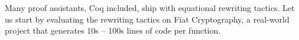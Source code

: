 \documentclass[sn-mathphys,pdflatex]{sn-jnl}%
\makeatletter
\renewcommand{\todo}[2][]{\tikzexternaldisable\@todo[#1]{#2}\tikzexternalenable}
\theoremstyle{thmstyleone}%
\theoremstyle{thmstyletwo}%
\theoremstyle{thmstylethree}%
\makeatother
\begin{document}
Many proof assistants, Coq included, ship with equational rewriting tactics.
Let us start by evaluating the rewriting tactics on Fiat Cryptography, a real-world project that generates 10s -- 100s lines of code per function.

\end{document}
